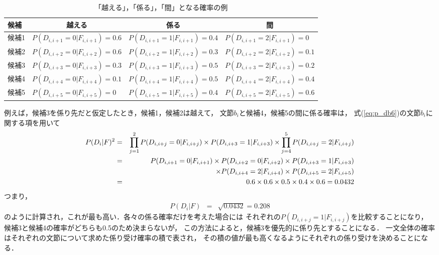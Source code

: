 {\small
\begin{table*}[htbp]
  \begin{center}
    \caption{「越える」，「係る」，「間」となる確率の例}
    \label{table:example}
    \renewcommand{\arraystretch}{}
    \begin{tabular}[c]{llll}
      \hline
      候補 & \multicolumn{1}{c}{越える} & \multicolumn{1}{c}{係る} 
      & \multicolumn{1}{c}{間}\\
      \hline
      候補1 & $P(D_{i,i+1}=0|F_{i,i+1})=0.6$ 
      & $P(D_{i,i+1}=1|F_{i,i+1})=0.4$ 
      & $P(D_{i,i+1}=2|F_{i,i+1})=0$ \\
      候補2 & $P(D_{i,i+2}=0|F_{i,i+2})=0.6$ 
      & $P(D_{i,i+2}=1|F_{i,i+2})=0.3$ 
      & $P(D_{i,i+2}=2|F_{i,i+2})=0.1$ \\
      候補3 & $P(D_{i,i+3}=0|F_{i,i+3})=0.3$ 
      & $P(D_{i,i+3}=1|F_{i,i+3})=0.5$ 
      & $P(D_{i,i+3}=2|F_{i,i+3})=0.2$ \\
      候補4 & $P(D_{i,i+4}=0|F_{i,i+4})=0.1$ 
      & $P(D_{i,i+4}=1|F_{i,i+4})=0.5$ 
      & $P(D_{i,i+4}=2|F_{i,i+4})=0.4$ \\
      候補5 & $P(D_{i,i+5}=0|F_{i,i+5})=0$ 
      & $P(D_{i,i+5}=1|F_{i,i+5})=0.4$ 
      & $P(D_{i,i+5}=2|F_{i,i+5})=0.6$ \\
      \hline
    \end{tabular}
  \end{center}
\end{table*}
}
例えば，候補3を係り先だと仮定したとき，候補1，候補2は越えて，
文節$b_{i}$と候補4，候補5の間に係る確率は，
式(\ref{eq:p_db6})の文節$b_{i}$に関する項を用いて
\begin{eqnarray*}
  P(D_{i}|F)^{2}
  & = & \prod_{j=1}^{2}P(D_{i,i+j}=0|F_{i,i+j})
  \times P(D_{i,i+3}=1|F_{i,i+3})
  \times \prod_{j=4}^{5}P(D_{i,i+j}=2|F_{i,i+j})\\
  & = & P(D_{i,i+1}=0|F_{i,i+1})\times P(D_{i,i+2}=0|F_{i,i+2})
  \times P(D_{i,i+3}=1|F_{i,i+3})\\
  & &  \times P(D_{i,i+4}=2|F_{i,i+4})
  \times P(D_{i,i+5}=2|F_{i,i+5})\\
  & = & 0.6\times 0.6\times 0.5\times 0.4\times 0.6 = 0.0432
\end{eqnarray*}
つまり，
\begin{eqnarray*}
  P(D_{i}|F) & = & \sqrt{0.0432} = 0.208
\end{eqnarray*}
のように計算され，これが最も高い．各々の係る確率だけを考えた場合には
それぞれの$P(D_{i,i+j}=1|F_{i,i+j})$を比較することになり，
候補3と候補4の確率がどちらも0.5のため決まらないが，
この方法によると，候補3を優先的に係り先とすることになる．
一文全体の確率はそれぞれの文節について求めた係り受け確率の積で表され，
その積の値が最も高くなるようにそれぞれの係り受けを決めることになる．

